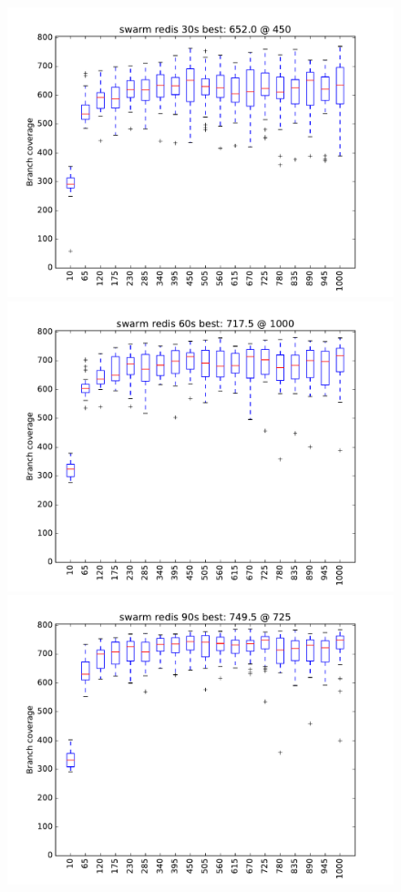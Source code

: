 \begin{figure}
\includegraphics[width=\columnwidth]{graphs/redisswarm30}
\includegraphics[width=\columnwidth]{graphs/redisswarm60}
\includegraphics[width=\columnwidth]{graphs/redisswarm90}
\end{figure}


